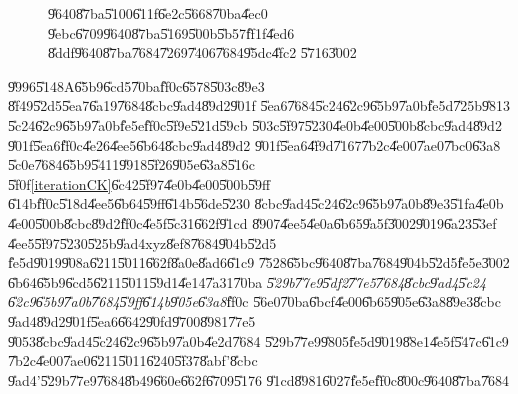 \begin{figure}[th]
\caption{\U{9640}\U{87ba}\U{5100}\U{611f}\U{6e2c}\U{5668}\U{70ba}\U{4ec0}%
\U{9ebc}\U{6709}\U{9640}\U{87ba}\U{5169}\U{500b}\U{5b57}\U{ff1f}\U{4ed6}%
\U{8ddf}\U{9640}\U{87ba}\U{7684}\U{7269}\U{7406}\U{7684}\U{95dc}\U{4fc2}%
\U{5716}\U{3002}}
\label{gyro_relation_graph}
\begin{center}
 
\end{center}
\end{figure}

\bigskip

\U{9996}\U{5148}A\U{65b9}\U{6cd5}\U{70ba}\U{ff0c}\U{6578}\U{503c}\U{89e3}%
\U{8f49}\U{52d5}\U{5ea7}\U{6a19}\U{7684}\U{8cbc}\U{9ad4}\U{89d2}\U{901f}%
\U{5ea6}\U{7684}\U{5c24}\U{62c9}\U{65b9}\U{7a0b}\U{fe5d}\U{725b}\U{9813}%
\U{5c24}\U{62c9}\U{65b9}\U{7a0b}\U{fe5e}\U{ff0c}\U{5f9e}\U{521d}\U{59cb}%
\U{503c}\U{5f97}\U{5230}\U{4e0b}\U{4e00}\U{500b}\U{8cbc}\U{9ad4}\U{89d2}%
\U{901f}\U{5ea6}\U{ff0c}\U{4e26}\U{4ee5}\U{6b64}\U{8cbc}\U{9ad4}\U{89d2}%
\U{901f}\U{5ea6}\U{4f9d}\U{7167}\U{7b2c}\U{4e00}\U{7ae0}\U{7bc0}\U{63a8}%
\U{5c0e}\U{7684}\U{65b9}\U{5411}\U{9918}\U{5f26}\U{905e}\U{63a8}\U{516c}%
\U{5f0f}\ref{iterationCK}\U{6c42}\U{5f97}\U{4e0b}\U{4e00}\U{500b}\U{59ff}%
\U{614b}\U{ff0c}\U{518d}\U{4ee5}\U{6b64}\U{59ff}\U{614b}\U{56de}\U{5230}%
\U{8cbc}\U{9ad4}\U{5c24}\U{62c9}\U{65b9}\U{7a0b}\U{89e3}\U{51fa}\U{4e0b}%
\U{4e00}\U{500b}\U{8cbc}\U{89d2}\U{ff0c}\U{4e5f}\U{5c31}\U{662f}\U{91cd}%
\U{8907}\U{4ee5}\U{4e0a}\U{6b65}\U{9a5f}\U{3002}\U{9019}\U{6a23}\U{53ef}%
\U{4ee5}\U{5f97}\U{5230}\U{525b}\U{9ad4}xyz\U{8ef8}\U{7684}\U{904b}\U{52d5}%
\U{fe5d}\U{9019}\U{908a}\U{6211}\U{5011}\U{662f}\U{8a0e}\U{8ad6}\U{61c9}%
\U{7528}\U{65bc}\U{9640}\U{87ba}\U{7684}\U{904b}\U{52d5}\U{fe5e}\U{3002}%
\U{6b64}\U{65b9}\U{6cd5}\U{6211}\U{5011}\U{59d1}\U{4e14}\U{7a31}\U{70ba}%
\emph{\U{529b}\U{77e9}\U{5df2}\U{77e5}\U{7684}\U{8cbc}\U{9ad4}\U{5c24}%
\U{62c9}\U{65b9}\U{7a0b}\U{7684}\U{59ff}\U{614b}\U{905e}\U{63a8}}\U{ff0c}%
\U{56e0}\U{70ba}\U{6bcf}\U{4e00}\U{6b65}\U{905e}\U{63a8}\U{89e3}\U{8cbc}%
\U{9ad4}\U{89d2}\U{901f}\U{5ea6}\U{6642}\U{90fd}\U{9700}\U{8981}\U{77e5}%
\U{9053}\U{8cbc}\U{9ad4}\U{5c24}\U{62c9}\U{65b9}\U{7a0b}\U{4e2d}\U{7684}%
\U{529b}\U{77e9}\U{9805}\U{fe5d}\U{9019}\U{88e1}\U{4e5f}\U{547c}\U{61c9}%
\U{7b2c}\U{4e00}\U{7ae0}\U{6211}\U{5011}\U{6240}\U{5f37}\U{8abf}'\U{8cbc}%
\U{9ad4}'\U{529b}\U{77e9}\U{7684}\U{8b49}\U{660e}\U{662f}\U{6709}\U{5176}%
\U{91cd}\U{8981}\U{6027}\U{fe5e}\U{ff0c}\U{800c}\U{9640}\U{87ba}\U{7684}%
